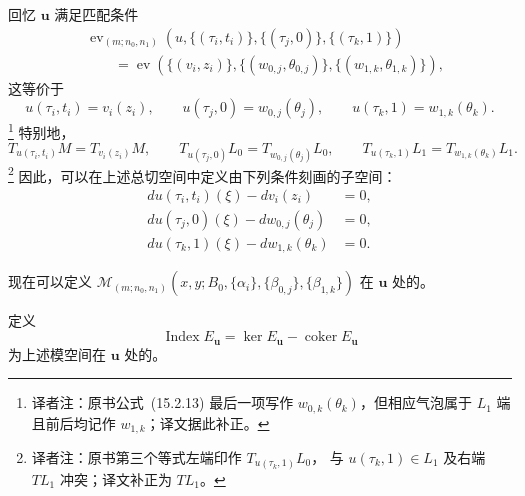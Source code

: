 回忆 $\mathbf u$ 满足匹配条件
\[
\begin{aligned}
 &\operatorname{ev}_{(m;n_0,n_1)}
 (u,\{(\tau_i,t_i)\},\{(\tau_j,0)\},\{(\tau_k,1)\})\\
 &\qquad=\operatorname{ev}
 (\{(v_i,z_i)\},\{(w_{0,j},\theta_{0,j})\},
 \{(w_{1,k},\theta_{1,k})\}),
\end{aligned}
\]
这等价于
\begin{equation}
 u(\tau_i,t_i)=v_i(z_i),\qquad
 u(\tau_j,0)=w_{0,j}(\theta_j),\qquad
 u(\tau_k,1)=w_{1,k}(\theta_k).
 \label{eq:cusp-component-matching}
\end{equation}
\footnote{译者注：原书公式~(15.2.13) 最后一项写作
$w_{0,k}(\theta_k)$，但相应气泡属于 $L_1$ 端且前后均记作 $w_{1,k}$；译文据此补正。}
特别地，
\[
 T_{u(\tau_i,t_i)}M=T_{v_i(z_i)}M,
 \qquad T_{u(\tau_j,0)}L_0=T_{w_{0,j}(\theta_j)}L_0,
 \qquad T_{u(\tau_k,1)}L_1=T_{w_{1,k}(\theta_k)}L_1.
\]
\footnote{译者注：原书第三个等式左端印作 $T_{u(\tau_k,1)}L_0$，
与 $u(\tau_k,1)\in L_1$ 及右端 $TL_1$ 冲突；译文补正为 $TL_1$。}
因此，可以在上述总切空间中定义由下列条件刻画的子空间：
\begin{equation}
 \begin{aligned}
 du(\tau_i,t_i)(\xi)-dv_i(z_i)&=0,\\
 du(\tau_j,0)(\xi)-dw_{0,j}(\theta_j)&=0,\\
 du(\tau_k,1)(\xi)-dw_{1,k}(\theta_k)&=0.
 \end{aligned}
 \label{eq:linearized-cusp-matching}
\end{equation}

现在可以定义
$\mathcal M_{(m;n_0,n_1)}(x,y;B_0,\{\alpha_i\},\{\beta_{0,j}\},\{\beta_{1,k}\})$
在 $\mathbf u$ 处的\termVirtualTangentSpace{}。

\begin{definition}
\label{def:virtual-tangent-cusp-space}
定义
\[
 \operatorname{Index}E_{\mathbf u}
 =\ker E_{\mathbf u}-\operatorname{coker}E_{\mathbf u}
\]
为上述模空间在 $\mathbf u$ 处的\termVirtualTangentSpace{}。
\end{definition}

